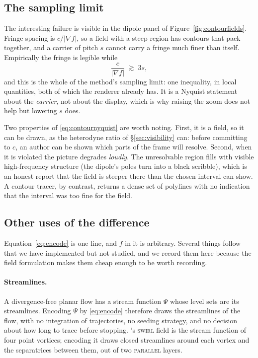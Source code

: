 \subsection{The sampling limit}

The interesting failure is visible in the dipole panel of
Figure~\ref{fig:contourfields}. Fringe spacing is $c/|\nabla f|$, so a field with
a steep region has contours that pack together, and a carrier of pitch $s$ cannot
carry a fringe much finer than itself. Empirically the fringe is legible while
\begin{equation}
  \frac{c}{|\nabla f|} \;\gtrsim\; 3s,
  \label{eq:contournyquist}
\end{equation}
and this is the whole of the method's sampling limit: one inequality, in local
quantities, both of which the renderer already has. It is a Nyquist statement
about the \emph{carrier}, not about the display, which is why raising the zoom
does not help but lowering $s$ does.

Two properties of \eqref{eq:contournyquist} are worth noting. First, it is a field, so it
can be drawn, as the heterodyne ratio of \S\ref{sec:visibility} can:
before committing to $c$, an author can be shown which parts of the frame will
resolve. Second, when it is violated the picture degrades \emph{loudly}. The
unresolvable region fills with visible high-frequency structure (the dipole's
poles turn into a black scribble), which is an honest report that the field is
steeper there than the chosen interval can show. A contour tracer, by contrast, returns a dense set of polylines with no
indication that the interval was too fine for the field.

\subsection{Other uses of the difference}

Equation~\eqref{eq:encode} is one line, and $f$ in it is arbitrary. Several things
follow that we have implemented but not studied, and we record them here
because the field formulation makes them cheap enough to be worth recording.

\paragraph{Streamlines.} A divergence-free planar flow has a stream function
$\Psi$ whose level sets are its streamlines. Encoding $\Psi$ by
\eqref{eq:encode} therefore draws the streamlines of the flow, with no
integration of trajectories, no seeding strategy, and no decision about how long
to trace before stopping. \Moire{}'s \textsc{swirl} field is the stream function
of four point vortices; encoding it draws closed streamlines around each vortex
and the separatrices between them, out of two \textsc{parallel} layers.

